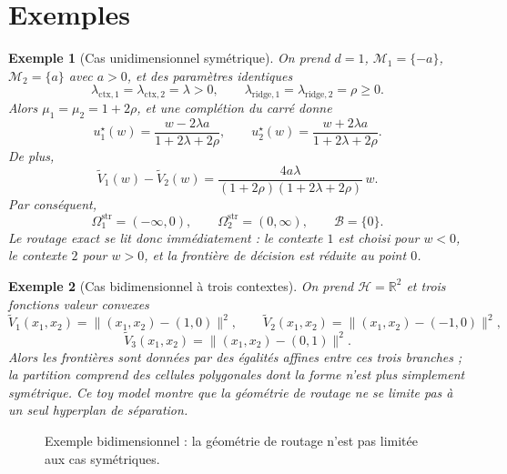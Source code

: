 \documentclass[11pt,a4paper]{article}
\newtheorem{example}{Exemple}[section]
\newcommand{\R}{\mathbb R}
\newcommand{\Hh}{\mathcal H}
\newcommand{\Mcal}{\mathcal M}
\newcommand{\Bcal}{\mathcal B}
\begin{document}
\section{Exemples}

\begin{example}[Cas unidimensionnel symétrique]
On prend \(d=1\), \(\Mcal_1=\{-a\}\), \(\Mcal_2=\{a\}\) avec \(a>0\), et des paramètres identiques
\[
\lambda_{\mathrm{ctx},1}=\lambda_{\mathrm{ctx},2}=\lambda>0,
\qquad
\lambda_{\mathrm{ridge},1}=\lambda_{\mathrm{ridge},2}=\rho\ge 0.
\]
Alors \(\mu_1=\mu_2=1+2\rho\), et une complétion du carré donne
\[
u_1^\star(w)=\frac{w-2\lambda a}{1+2\lambda+2\rho},
\qquad
u_2^\star(w)=\frac{w+2\lambda a}{1+2\lambda+2\rho}.
\]
De plus,
\[
\widetilde V_1(w)-\widetilde V_2(w)
=
\frac{4a\lambda}{(1+2\rho)(1+2\lambda+2\rho)}\,w.
\]
Par conséquent,
\[
\Omega_1^{\mathrm{str}}=(-\infty,0),
\qquad
\Omega_2^{\mathrm{str}}=(0,\infty),
\qquad
\Bcal=\{0\}.
\]
Le routage exact se lit donc immédiatement : le contexte \(1\) est choisi pour \(w<0\), le contexte \(2\) pour \(w>0\), et la frontière de décision est réduite au point \(0\).
\end{example}

\begin{example}[Cas bidimensionnel à trois contextes]
On prend \(\Hh=\R^2\) et trois fonctions valeur convexes
\[
\widetilde V_1(x_1,x_2)=\|(x_1,x_2)-(1,0)\|^2,
\qquad
\widetilde V_2(x_1,x_2)=\|(x_1,x_2)-(-1,0)\|^2,
\]
\[
\widetilde V_3(x_1,x_2)=\|(x_1,x_2)-(0,1)\|^2.
\]
Alors les frontières sont données par des égalités affines entre ces trois branches ; la partition comprend des cellules polygonales dont la forme n'est plus simplement symétrique. Ce toy model montre que la géométrie de routage ne se limite pas à un seul hyperplan de séparation.
\end{example}

\begin{figure}[ht]
\centering
{}
\caption{Exemple bidimensionnel : la géométrie de routage n'est pas limitée aux cas symétriques.}
\end{figure}
\end{document}
